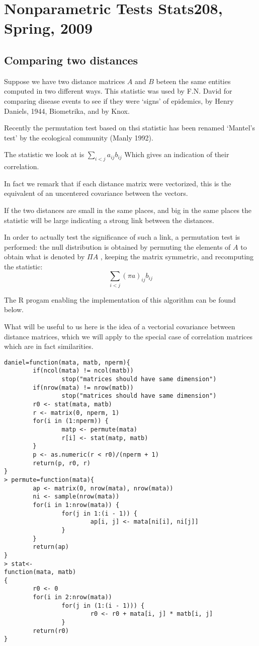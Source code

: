 \documentclass{article}
\begin{document}
\section*{\sf Nonparametric Tests \hfill Stats208, Spring, 2009}
\subsection*{\sf Comparing two distances}
Suppose we have two distance matrices  $A$ and $B$ 
beteen the same entities computed
in two different ways.
This statistic was used by
F.N. David for comparing disease events
to see if they were `signs' of epidemics,
by Henry Daniels, 1944, Biometrika,
and by Knox.

Recently the 
permutation test
based on thsi statistic
has been renamed
`Mantel's test' by the
ecological community
(Manly 1992).


The statistic we look at is
$\sum_{i<j} a_{ij} b_{ij}$ Which gives
an indication of their correlation.

In fact we  remark that if each distance matrix
were vectorized, this is the equivalent of an
uncentered
covariance between the vectors.

If the two distances are small in the same places,
and big in the same places the statistic will be large
indicating a strong link between the distances.

In order to actually test the significance of such a link,
a permutation test is performed: 
the null distribution
is obtained by permuting the elements
of $A$ to obtain what is denoted by $\Pi A$
, keeping the matrix symmetric, and
recomputing
the statistic:
$$\sum_{i<j} (\pi a)_{ij} b_{ij}$$

The R progam enabling the 
implementation of this algorithm can be
found below.

What will be useful to us here
is the idea of a vectorial covariance 
between distance matrices, which we will
apply to the special case of correlation
matrices which are in fact similarities.

{\small
\begin{verbatim}
daniel=function(mata, matb, nperm){
        if(ncol(mata) != ncol(matb))
                stop("matrices should have same dimension")
        if(nrow(mata) != nrow(matb))
                stop("matrices should have same dimension")
        r0 <- stat(mata, matb)
        r <- matrix(0, nperm, 1)
        for(i in (1:nperm)) {
                matp <- permute(mata)
                r[i] <- stat(matp, matb)
        }
        p <- as.numeric(r < r0)/(nperm + 1)
        return(p, r0, r)
}
> permute=function(mata){
        ap <- matrix(0, nrow(mata), nrow(mata))
        ni <- sample(nrow(mata))
        for(i in 1:nrow(mata)) {
                for(j in 1:(i - 1)) {
                        ap[i, j] <- mata[ni[i], ni[j]]
                }
        }
        return(ap)
}
> stat<-
function(mata, matb)
{
        r0 <- 0
        for(i in 2:nrow(mata))
                for(j in (1:(i - 1))) {
                        r0 <- r0 + mata[i, j] * matb[i, j]
                }
        return(r0)
}
\end{verbatim}
}
\end{document}
